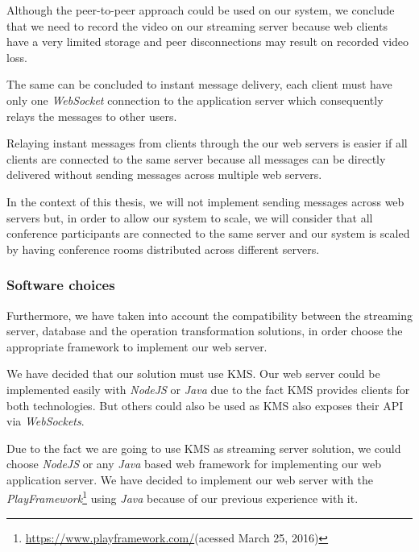 \documentclass[conference,compsoc,a4paper]{IEEEtran}
\begin{document}
	Although the peer-to-peer approach could be used on our system, we conclude that we need to record the video on our streaming server because web clients have a very limited storage and peer disconnections may result on recorded video loss. 

	The same can be concluded to instant message delivery, each client must have only one \emph{WebSocket} connection to the application server which consequently relays the messages to other users.

	Relaying instant messages from clients through the our web servers is easier if all clients are connected to the same server because all messages can be directly delivered without sending messages across multiple web servers. 

	In the context of this thesis, we will not implement sending messages across web servers but, in order to allow our system to scale, we will consider that all conference participants are connected to the same server and our system is scaled by having conference rooms distributed across different servers.

\subsubsection{Software choices}

Furthermore, we have taken into account the compatibility between the streaming server, database and the operation transformation solutions, in order choose the appropriate framework to implement our web server.

We have decided that our solution must use \gls{KMS}. Our web server could be implemented easily with \emph{NodeJS} or \emph{Java} due to the fact \gls{KMS} provides clients for both technologies. But others could also be used as \gls{KMS} also exposes their \gls{API} via \emph{WebSockets}.

Due to the fact we are going to use \gls{KMS} as streaming server solution, we could choose \emph{NodeJS} or any \emph{Java} based web framework for implementing our web application server. We have decided to implement our web server with the \emph{PlayFramework}\footnote{\url{https://www.playframework.com/}(acessed March 25, 2016)} using \emph{Java} because of our previous experience with it.
\end{document}
